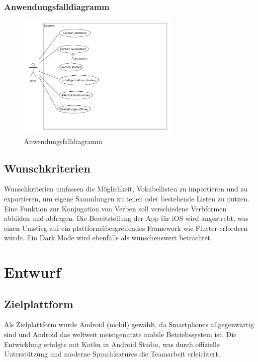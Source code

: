 \documentclass[12pt,a4paper]{article}
\begin{document}
\subsubsection{Anwendungsfalldiagramm}
\begin{figure}[H]
    \centering
    \includegraphics[width=0.7\textwidth]{use-case-diagramm.jpeg}
    \caption{Anwendungsfalldiagramm}
    \label{fig:festes_bild}
\end{figure}

\subsection{Wunschkriterien}
Wunschkriterien umfassen die Möglichkeit, Vokabellisten zu importieren und zu exportieren, um eigene Sammlungen zu teilen oder bestehende Listen zu nutzen. Eine Funktion zur Konjugation von Verben soll verschiedene Verbformen abbilden und abfragen. Die Bereitstellung der App für iOS wird angestrebt, was einen Umstieg auf ein plattformübergreifendes Framework wie Flutter erfordern würde. Ein Dark Mode wird ebenfalls als wünschenswert betrachtet.

\section{Entwurf}

\subsection{Zielplattform}
Als Zielplattform wurde Android (mobil) gewählt, da Smartphones allgegenwärtig sind und Android das weltweit meistgenutzte mobile Betriebssystem ist. Die Entwicklung erfolgte mit Kotlin in Android Studio, was durch offizielle Unterstützung und moderne Sprachfeatures die Teamarbeit erleichtert.
\end{document}
